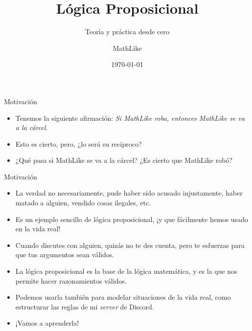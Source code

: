 \documentclass[dvisvgm,hypertex,aspectratio=169]{beamer}
\title{Lógica Proposicional}
\subtitle{Teoría y práctica desde cero}
\author{MathLike}
\date{\today}
\institute{Administrador de The Math Guys}
\begin{document}
\begin{frame}
  \titlepage
\end{frame}
\begin{frame}{Motivación}
  \begin{itemize}[<+->]
    \item Tenemos la siguiente afirmación: \textit{Si MathLike roba, entonces MathLike se va a la cárcel}.
    \item Esto es cierto, pero, ¿lo será su recíproco?
    \item ¿Qué pasa si MathLike se va a la cárcel? ¿Es cierto que MathLike robó?
  \end{itemize}
\end{frame}
\begin{frame}{Motivación}
  \begin{itemize}[<+->]
    \item La verdad no necesariamente, pude haber sido acusado injustamente, haber matado a alguien, vendido cosas ilegales, etc.
    \item Es un ejemplo sencillo de lógica proposicional, ¡y que fácilmente hemos usado en la vida real!
    \item Cuando discutes con alguien, quizás no te des cuenta, pero te esfuerzas para que tus argumentos sean válidos.
    \item La lógica proposicional es la base de la lógica matemática, y es la que nos permite hacer razonamientos válidos.
    \item Podemos usarla también para modelar situaciones de la vida real, como estructurar las reglas de mi \textit{server} de Discord. 
    \item ¡Vamos a aprenderla! 
  \end{itemize}
\end{frame}
\end{document}
